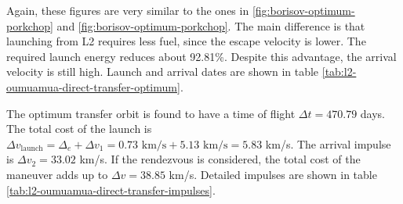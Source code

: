   \label{fig:oumuamua-optimum-porkchop}
Again, these figures are very similar to the ones in
\ref{fig:borisov-optimum-porkchop} and
\ref{fig:borisov-optimum-porkchop}. The main difference is that launching
from L2 requires less fuel, since the escape velocity is lower. The required
launch energy reduces about 92.81\%. Despite this advantage, the arrival
velocity is still high. Launch and arrival dates are shown in table
\ref{tab:l2-oumuamua-direct-transfer-optimum}.




The optimum transfer orbit is found to have a time of flight $\Delta t = 470.79$
days. The total cost of the launch is $\Delta v_\text{launch} = \Delta_e +
\Delta v_1 = 0.73 \text{ km/s} + 5.13 \text{ km/s} = 5.83$ km/s. The arrival
impulse is $\Delta v_2 = 33.02$ km/s. If the rendezvous is considered, the total
cost of the maneuver adds up to $\Delta v = 38.85$ km/s. Detailed impulses are
shown in table \ref{tab:l2-oumuamua-direct-transfer-impulses}.


















